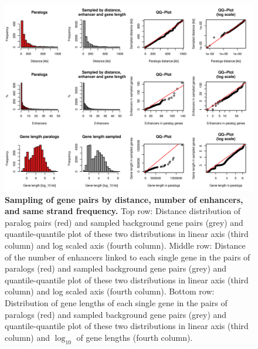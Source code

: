 \documentclass[a4paper,twoside=true,openright,parskip=full,chapterprefix=true,11pt,headings=normal,bibliography=totoc,listof=totoc,titlepage=on,captions=tableabove,draft=false]{scrreprt}
\theoremstyle{definition}
\theoremstyle{definition}
\theoremstyle{definition}
\theoremstyle{remark}
\begin{document}
\begin{figure}

{\centering \includegraphics[width=0.5\linewidth]{figures/paralog/SI/figS6} 

}

\caption{\textbf{Sampling of gene pairs by distance,
number of enhancers, and same strand frequency.} Top row: Distance
distribution of paralog pairs (red) and sampled background gene pairs
(grey) and quantile-quantile plot of these two distributions in linear
axis (third column) and log scaled axis (fourth column). Middle row:
Distance of the number of enhancers linked to each single gene in the
pairs of paralogs (red) and sampled background gene pairs (grey) and
quantile-quantile plot of these two distributions in linear axis (third
column) and log scaled axis (fourth column). Bottom row: Distribution of
gene lengths of each single gene in the pairs of paralogs (red) and
sampled background gene pairs (grey) and quantile-quantile plot of these
two distributions in linear axis (third column) and \(\log_{10}\) of
gene lengths (fourth column).}\label{fig:samplingDistEhLen}
\end{figure}
\end{document}
